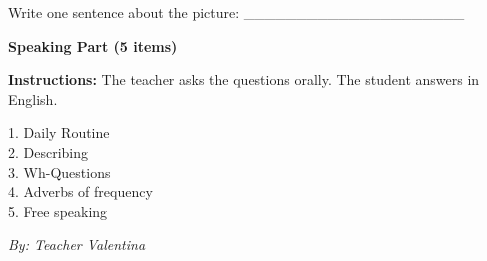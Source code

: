 \documentclass[12pt, a4paper]{article}
\begin{document}
Write one sentence about the picture:
\_\_\_\_\_\_\_\_\_\_\_\_\_\_\_\_\_\_\_\_\_

\begin{center}
    \large \textbf{Speaking Part (5 items)}
\end{center}

\textbf{Instructions:} The teacher asks the questions orally. The student answers in English.

1. Daily Routine \\
2. Describing \\
3. Wh-Questions \\
4. Adverbs of frequency \\
5. Free speaking

\vfill
\begin{flushright}
    \textit{By: Teacher Valentina}
\end{flushright}
\end{document}
